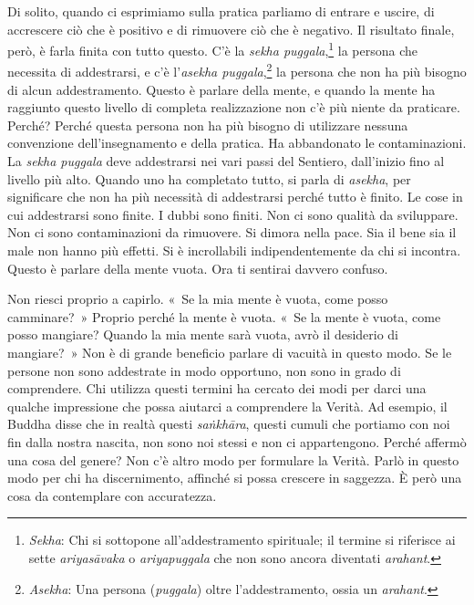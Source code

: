Di solito, quando ci esprimiamo sulla pratica parliamo di entrare e
uscire, di accrescere ciò che è positivo e di rimuovere ciò che è
negativo. Il risultato finale, però, è farla finita con tutto questo.
C'è la \emph{sekha puggala},\footnote{\emph{Sekha}: Chi si sottopone
  all'addestramento spirituale; il termine si riferisce ai sette
  \emph{ariyasāvaka} o \emph{ariyapuggala} che non sono ancora diventati
  \emph{arahant}.} la persona che necessita di addestrarsi, e c'è
l'\emph{asekha puggala},\footnote{\emph{Asekha}: Una persona
  (\emph{puggala}) oltre l'addestramento, ossia un \emph{arahant}.} la
persona che non ha più bisogno di alcun addestramento. Questo è parlare
della mente, e quando la mente ha raggiunto questo livello di completa
realizzazione non c'è più niente da praticare. Perché? Perché questa
persona non ha più bisogno di utilizzare nessuna convenzione
dell'insegnamento e della pratica. Ha abbandonato le contaminazioni. La
\emph{sekha puggala} deve addestrarsi nei vari passi del Sentiero,
dall'inizio fino al livello più alto. Quando uno ha completato tutto, si
parla di \emph{asekha}, per significare che non ha più necessità di
addestrarsi perché tutto è finito. Le cose in cui addestrarsi sono
finite. I dubbi sono finiti. Non ci sono qualità da sviluppare. Non ci
sono contaminazioni da rimuovere. Si dimora nella pace. Sia il bene sia
il male non hanno più effetti. Si è incrollabili indipendentemente da
chi si incontra. Questo è parlare della mente vuota. Ora ti sentirai
davvero confuso.

Non riesci proprio a capirlo. «~Se la mia mente è vuota, come posso
camminare?~» Proprio perché la mente è vuota. «~Se la mente è vuota,
come posso mangiare? Quando la mia mente sarà vuota, avrò il desiderio
di mangiare?~» Non è di grande beneficio parlare di vacuità in questo
modo. Se le persone non sono addestrate in modo opportuno, non sono in
grado di comprendere. Chi utilizza questi termini ha cercato dei modi
per darci una qualche impressione che possa aiutarci a comprendere la
Verità. Ad esempio, il Buddha disse che in realtà questi
\emph{saṅkhāra}, questi cumuli che portiamo con noi fin dalla nostra
nascita, non sono noi stessi e non ci appartengono. Perché affermò una
cosa del genere? Non c'è altro modo per formulare la Verità. Parlò in
questo modo per chi ha discernimento, affinché si possa crescere in
saggezza. È però una cosa da contemplare con accuratezza.

